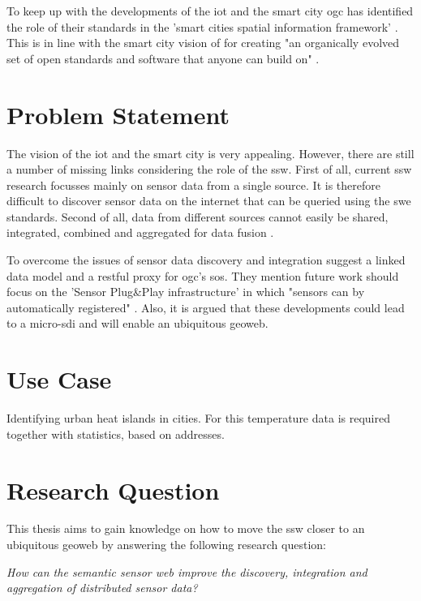 To keep up with the developments of the \ac{iot} and the smart city \ac{ogc} has identified the role of their standards in the 'smart cities spatial information framework' \citep{SC:OGC}. This is in line with the smart city vision of \cite{SC:Townsend} for creating "an organically evolved set of open standards and software that anyone can build on" \citep[p. 290]{SC:Townsend}.

\section{Problem Statement}
The vision of the \ac{iot} and the smart city is very appealing. However, there are still a number of missing links considering the role of the \ac{ssw}. First of all, current \ac{ssw} research focusses mainly on sensor data from a single source. It is therefore difficult to discover sensor data on the internet that can be queried using the \ac{swe} standards. Second of all, data from different sources cannot easily be shared, integrated, combined and aggregated for data fusion \citep{SSW:Wang, SSW:Ji, SSW:Corcho}. 

To overcome the issues of sensor data discovery and integration \cite{SSW:Janowicz} suggest a linked data model and a \ac{rest}ful proxy for \ac{ogc}’s \ac{sos}. They mention future work should focus on the 'Sensor Plug\&Play infrastructure' in which "sensors can by automatically registered" \cite[p. 21]{SSW:Janowicz}. Also, it is argued that these developments could lead to a \ac{micro-sdi} and will enable an ubiquitous geoweb.

\section{Use Case}
Identifying urban heat islands in cities. For this temperature data is required together with statistics, based on addresses.
 

\section{Research Question}
This thesis aims to gain knowledge on how to move the \ac{ssw} closer to an ubiquitous geoweb by answering the following research question: 

\textit{How can the semantic sensor web improve the discovery, integration and aggregation of distributed sensor data?}

